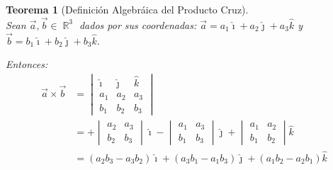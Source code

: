 \documentclass[12pt, fleqn]{report}                             %
\newcommand \ForceNewLine {$\Space$\\}                          %
\DeclareMathOperator \Space {\quad}                             %
\newtheorem{Theorem}{Teorema}[section]                          %
\theoremstyle{break}                                            %
\DeclareMathOperator \Reals        {\mathbb{R}}                 %
\newcommand{\hati} {\hat{\imath}}                               %
\newcommand{\hatj} {\hat{\jmath}}                               %
\newcommand{\hatk} {\hat{k}}                                    %
\newcommand{\lVector}[1]                                        %
        { \ensuremath{\begin{vmatrix}#1\end{vmatrix}} }             %
\begin{document}
                \vspace{1em}
                \begin{Theorem}[Definición Algebráica del Producto Cruz]
                    \ForceNewLine
                    Sean $\vec{a}, \vec{b} \in \Reals^3$ dados por sus coordenadas:
                    $\vec{a}=a_1\hati + a_2\hatj + a_3\hatk$ y $\vec{b} = b_1\hati + b_2\hatj + b_3\hatk$.

                    Entonces:
                    \begin{align}
                        \vec{a} \times \vec{b} 
                            &= 
                                \lVector{\hati & \hatj & \hatk \\ a_1 & a_2 & a_3 \\ b_1 & b_2 & b_3}           \\
                            &= 
                                + \lVector{a_2 & a_3 \\ b_2 & b_3} \hati
                                - \lVector{a_1 & a_3 \\ b_1 & b_3} \hatj
                                + \lVector{a_1 & a_2 \\ b_1 & b_2} \hatk                                        \\
                            &= 
                                (a_2b_3 - a_3b_2)\hati + (a_3b_1 - a_1b_3)\hatj + (a_1b_2 - a_2b_1)\hatk
                    \end{align}
                \end{Theorem}
            
\end{document}
